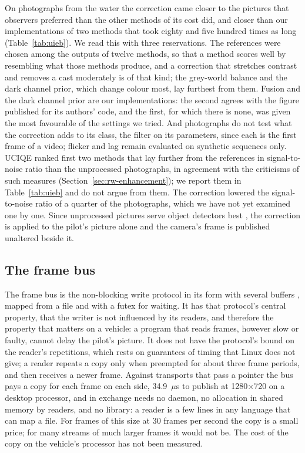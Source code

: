 On photographs from the water the correction came closer to the pictures that
observers preferred than the other methods of its cost did, and closer than our
implementations of two methods that took eighty and five hundred times as
long (Table~\ref{tab:uieb}). We read this with three reservations. The
references were chosen among the outputs of twelve methods, so that a method
scores well by resembling what those methods produce, and a correction that
stretches contrast and removes a cast moderately is of that kind; the grey-world
balance and the dark channel prior, which change colour most, lay furthest from
them. Fusion and the dark channel prior are our implementations: the second agrees
with the figure published for its authors' code, and the first, for which there
is none, was given the most favourable of the settings we tried. And photographs do not test what
the correction adds to its class, the filter on its parameters, since each is
the first frame of a video; flicker and lag remain evaluated on synthetic
sequences only. UCIQE ranked first two methods that lay
further from the references in signal-to-noise ratio than the unprocessed
photographs, in agreement with the criticisms of such measures (Section~\ref{sec:rw-enhancement}); we report them
in Table~\ref{tab:uieb} and do not argue from them. The correction lowered the
signal-to-noise ratio of a quarter of the photographs, which we have not yet
examined one by one. Since
unprocessed pictures serve object detectors best \cite{wang2024detectors}, the
correction is applied to the pilot's picture alone and the camera's frame is
published unaltered beside it.

\subsection{The frame bus}

The frame bus is the non-blocking write protocol in its form with
several buffers
\cite{kopetz1993}, mapped from a file and with a futex for waiting. It has that
protocol's central property, that the writer is not influenced by its
readers, and
therefore the property that matters on a vehicle: a program that reads frames,
however slow or faulty, cannot delay the pilot's picture. It does not have the
protocol's bound on the reader's repetitions, which rests on
guarantees of timing
that Linux does not give; a reader repeats a copy only when preempted for about
three frame periods, and then receives a newer frame. Against
transports that pass a
pointer \cite{pohnl2023} the bus pays a copy for each frame on each
side, 34.9~$\mu$s
to publish at 1280$\times$720 on a desktop processor, and in exchange needs no
daemon, no allocation in shared memory by readers, and no library: a
reader is a few
lines in any language that can map a file. For frames of this size at
30 frames per
second the copy is a small price; for many streams of much larger
frames it would
not be. The cost of the copy on the vehicle's processor has not been measured.

